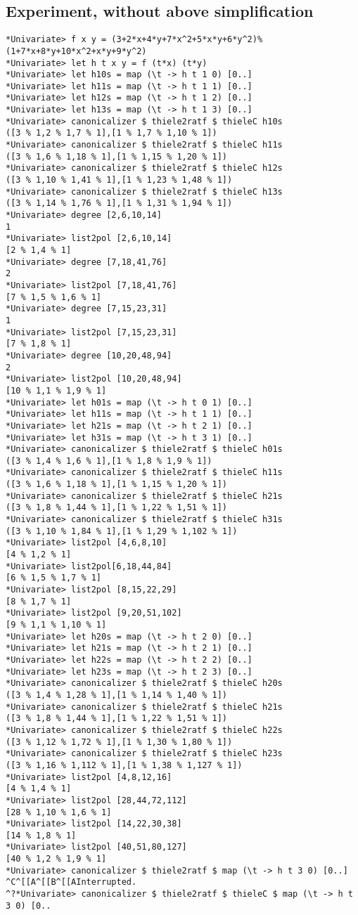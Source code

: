 \documentclass[11pt]{book}
\begin{document}
\subsection{Experiment, without above simplification}
\begin{verbatim}
*Univariate> f x y = (3+2*x+4*y+7*x^2+5*x*y+6*y^2)%(1+7*x+8*y+10*x^2+x*y+9*y^2)
*Univariate> let h t x y = f (t*x) (t*y)
*Univariate> let h10s = map (\t -> h t 1 0) [0..]
*Univariate> let h11s = map (\t -> h t 1 1) [0..]
*Univariate> let h12s = map (\t -> h t 1 2) [0..]
*Univariate> let h13s = map (\t -> h t 1 3) [0..]
*Univariate> canonicalizer $ thiele2ratf $ thieleC h10s
([3 % 1,2 % 1,7 % 1],[1 % 1,7 % 1,10 % 1])
*Univariate> canonicalizer $ thiele2ratf $ thieleC h11s
([3 % 1,6 % 1,18 % 1],[1 % 1,15 % 1,20 % 1])
*Univariate> canonicalizer $ thiele2ratf $ thieleC h12s
([3 % 1,10 % 1,41 % 1],[1 % 1,23 % 1,48 % 1])
*Univariate> canonicalizer $ thiele2ratf $ thieleC h13s
([3 % 1,14 % 1,76 % 1],[1 % 1,31 % 1,94 % 1])
*Univariate> degree [2,6,10,14]
1
*Univariate> list2pol [2,6,10,14]
[2 % 1,4 % 1]
*Univariate> degree [7,18,41,76]
2
*Univariate> list2pol [7,18,41,76]
[7 % 1,5 % 1,6 % 1]
*Univariate> degree [7,15,23,31]
1
*Univariate> list2pol [7,15,23,31]
[7 % 1,8 % 1]
*Univariate> degree [10,20,48,94]
2
*Univariate> list2pol [10,20,48,94]
[10 % 1,1 % 1,9 % 1]
*Univariate> let h01s = map (\t -> h t 0 1) [0..]
*Univariate> let h11s = map (\t -> h t 1 1) [0..]
*Univariate> let h21s = map (\t -> h t 2 1) [0..]
*Univariate> let h31s = map (\t -> h t 3 1) [0..]
*Univariate> canonicalizer $ thiele2ratf $ thieleC h01s
([3 % 1,4 % 1,6 % 1],[1 % 1,8 % 1,9 % 1])
*Univariate> canonicalizer $ thiele2ratf $ thieleC h11s
([3 % 1,6 % 1,18 % 1],[1 % 1,15 % 1,20 % 1])
*Univariate> canonicalizer $ thiele2ratf $ thieleC h21s
([3 % 1,8 % 1,44 % 1],[1 % 1,22 % 1,51 % 1])
*Univariate> canonicalizer $ thiele2ratf $ thieleC h31s
([3 % 1,10 % 1,84 % 1],[1 % 1,29 % 1,102 % 1])
*Univariate> list2pol [4,6,8,10]
[4 % 1,2 % 1]
*Univariate> list2pol[6,18,44,84]
[6 % 1,5 % 1,7 % 1]
*Univariate> list2pol [8,15,22,29]
[8 % 1,7 % 1]
*Univariate> list2pol [9,20,51,102]
[9 % 1,1 % 1,10 % 1]
*Univariate> let h20s = map (\t -> h t 2 0) [0..]
*Univariate> let h21s = map (\t -> h t 2 1) [0..]
*Univariate> let h22s = map (\t -> h t 2 2) [0..]
*Univariate> let h23s = map (\t -> h t 2 3) [0..]
*Univariate> canonicalizer $ thiele2ratf $ thieleC h20s 
([3 % 1,4 % 1,28 % 1],[1 % 1,14 % 1,40 % 1])
*Univariate> canonicalizer $ thiele2ratf $ thieleC h21s 
([3 % 1,8 % 1,44 % 1],[1 % 1,22 % 1,51 % 1])
*Univariate> canonicalizer $ thiele2ratf $ thieleC h22s 
([3 % 1,12 % 1,72 % 1],[1 % 1,30 % 1,80 % 1])
*Univariate> canonicalizer $ thiele2ratf $ thieleC h23s 
([3 % 1,16 % 1,112 % 1],[1 % 1,38 % 1,127 % 1])
*Univariate> list2pol [4,8,12,16]
[4 % 1,4 % 1]
*Univariate> list2pol [28,44,72,112]
[28 % 1,10 % 1,6 % 1]
*Univariate> list2pol [14,22,30,38]
[14 % 1,8 % 1]
*Univariate> list2pol [40,51,80,127]
[40 % 1,2 % 1,9 % 1]
*Univariate> canonicalizer $ thiele2ratf $ map (\t -> h t 3 0) [0..]
^C^[[A^[[B^[[AInterrupted.
^?*Univariate> canonicalizer $ thiele2ratf $ thieleC $ map (\t -> h t 3 0) [0..


\end{verbatim}
\end{document}
